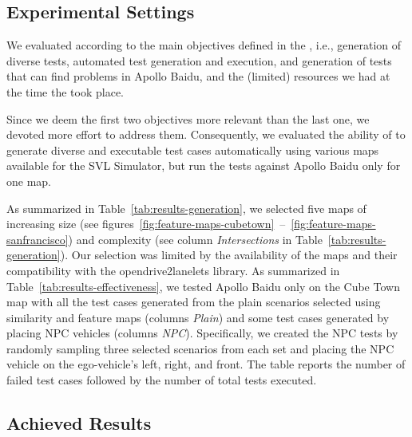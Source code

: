 \documentclass[conference]{IEEEtran}
\begin{document}
\subsection{Experimental Settings}
We evaluated \tool according to the main objectives defined in the \challenge, i.e., generation of diverse tests, automated test generation and execution, and generation of tests that can find problems in Apollo Baidu, and the (limited) resources we had at the time the \challenge took place.

Since we deem the first two objectives more relevant than the last one, we devoted more effort to address them. Consequently, we evaluated the ability of \tool to generate diverse and executable test cases automatically using various maps available for the SVL Simulator, but run the tests against Apollo Baidu only for one map.

As summarized in Table~\ref{tab:results-generation}, we selected five maps of increasing size (see figures~\ref{fig:feature-maps-cubetown}~--~\ref{fig:feature-maps-sanfrancisco}) and complexity (see column \emph{Intersections} in Table~\ref{tab:results-generation}). Our selection was limited by the availability of the maps and their compatibility with the opendrive2lanelets library. 
%
As summarized in Table~\ref{tab:results-effectiveness}, we tested Apollo Baidu only on the Cube Town map with all the test cases generated from the plain scenarios selected using similarity and feature maps (columns \emph{Plain}) and some test cases generated by placing NPC vehicles (columns \emph{NPC}). Specifically, we created the NPC tests by randomly sampling three selected scenarios from each set and placing the NPC vehicle on the ego-vehicle's left, right, and front. The table reports the number of failed test cases followed by the number of total tests executed.



\subsection{Achieved Results}
\end{document}
